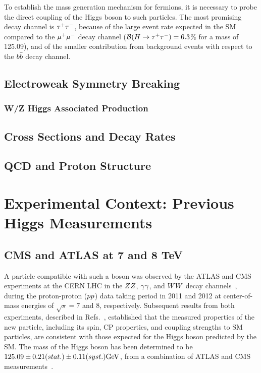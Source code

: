 To establish the mass generation mechanism for fermions,
 it is necessary to probe the direct coupling of
the Higgs boson to such particles.
The most promising decay channel is $\tau^+\tau^-$,
because of the large event rate expected in the SM compared to the $\mu^+\mu^-$ decay channel ($\mathcal{B}(H\to\tau^+\tau^-)=6.3$\% for a mass of 125.09\GeV), and of the smaller contribution from background events
with respect to the $b\bar{b}$ decay channel.

\subsection{Electroweak Symmetry Breaking}

\subsubsection{W/Z Higgs Associated Production}

\subsection{Cross Sections and Decay Rates}

\subsection{QCD and Proton Structure}

\section{Experimental Context: Previous Higgs Measurements}

\subsection{CMS and ATLAS at 7 and 8 TeV}
A particle compatible with such a boson was observed by the ATLAS and CMS experiments at the CERN LHC
in the $ZZ$, $\gamma \gamma$, and $WW$ decay channels~\cite{Aad:2012tfa, Chatrchyan:2012xdj, Chatrchyan:2013lba},
during the proton-proton ($pp$) data taking period in 2011 and 2012
at center-of-mass energies of $\sqrt{s} = 7$ and 8\TeV, respectively.
Subsequent results from both experiments, described in
Refs.~\cite{Aad:2015gba, Khachatryan:2014jba, Chatrchyan:2012jja, Aad:2013xqa, Khachatryan:2014kca,Sirunyan:2017exp},
established that the measured properties of the new particle,
including its spin, CP properties,
and coupling strengths to SM particles, are consistent with those expected for the Higgs boson predicted by the SM.
The mass of the Higgs boson has been determined to be
$125.09\pm0.21(stat.)\pm0.11(syst.)\mathrm{GeV}$, from a combination of
ATLAS and CMS measurements~\cite{Aad:2015zhl}.

